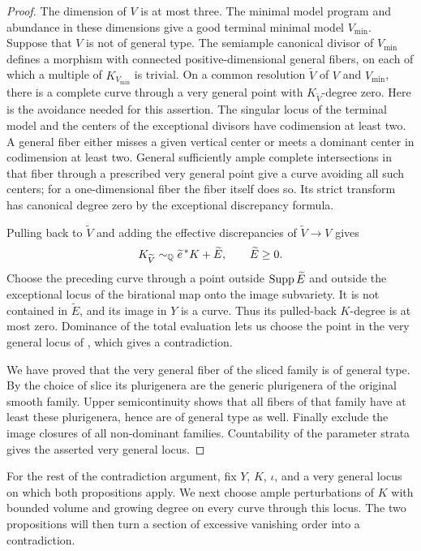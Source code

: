 \begin{proof}
The dimension of $V$ is at most three.  The minimal model program and
abundance in these dimensions give a good terminal minimal model
$V_{\min}$.  Suppose that $V$ is not of general type.  The semiample
canonical divisor of $V_{\min}$ defines a morphism with connected
positive-dimensional general fibers, on each of which a multiple of
$K_{V_{\min}}$ is trivial.  On a common resolution
$\widetilde V$ of $V$ and $V_{\min}$, there is a complete curve through
a very general point with $K_{\widetilde V}$-degree zero.  Here is the
avoidance needed for this assertion.  The singular locus of the
terminal model and the centers of the exceptional divisors have
codimension at least two.  A general fiber either misses a given
vertical center or meets a dominant center in codimension at least
two.  General sufficiently ample complete intersections in that
fiber through a prescribed very general point give a curve
avoiding all such centers; for a one-dimensional fiber the
fiber itself does so.  Its strict transform has canonical degree
zero by the exceptional discrepancy formula.

Pulling back  to $\widetilde V$
and adding the effective discrepancies of
$\widetilde V\to V$ gives
\[
 K_{\widetilde V}\sim_\mathbb Q \widetilde e^{\,*}K+\widetilde E,
 \qquad \widetilde E\ge0.
\]
Choose the preceding curve through a point outside
$\operatorname{Supp}\widetilde E$ and outside the exceptional locus of the
birational map onto the image subvariety.  It is not contained in
$\widetilde E$, and its image in $Y$ is a curve.  Thus its pulled-back
$K$-degree is at most zero.  Dominance of the total evaluation lets
us choose the point in the very general locus of
, which gives a contradiction.

We have proved that the very general fiber of the sliced family is
of general type.  By the choice of slice its plurigenera are the
generic plurigenera of the original smooth family.  Upper
semicontinuity shows that all fibers of that family have at least
these plurigenera, hence are of general type as well.  Finally
exclude the image closures of all non-dominant families.  Countability
of the parameter strata gives the asserted very general locus.
\end{proof}

For the rest of the contradiction argument, fix $Y$, $K$, $\iota$,
and a very general locus on which both propositions apply. We next
choose ample perturbations of $K$ with bounded volume and growing
degree on every curve through this locus. The two propositions will
then turn a section of excessive vanishing order into a contradiction.

